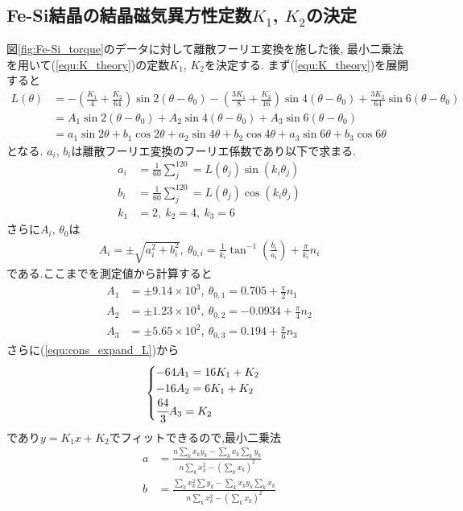 \subsection{Fe-Si結晶の結晶磁気異方性定数$K_1$, $K_2$の決定}
図\ref{fig:Fe-Si_torque}のデータに対して離散フーリエ変換を施した後,
最小二乗法を用いて(\ref{equ:K_theory})の定数$K_1$, $K_2$を決定する.
まず(\ref{equ:K_theory})を展開すると
\begin{align}
  \label{equ:cons_expand_L}
  L(\theta)&=-(\frac{K_1}{4}+\frac{K_2}{64})\sin2(\theta-\theta_0)-(\frac{3K_1}{8}+\frac{K_2}{16})\sin4(\theta-\theta_0)+\frac{3K_2}{64}\sin6(\theta-\theta_0)\nonumber\\
  &=A_1\sin2(\theta-\theta_0)+A_2\sin4(\theta-\theta_0)+A_3\sin6(\theta-\theta_0)\nonumber\\
  &=a_1\sin2\theta+b_1\cos2\theta+a_2\sin4\theta+b_2\cos4\theta+a_3\sin6\theta+b_3\cos6\theta
\end{align}
となる. $a_i$, $b_i$は離散フーリエ変換のフーリエ係数であり以下で求まる.
\begin{align}
  a_i&=\frac{1}{60}\sum^{120}_j=L(\theta_j)\sin(k_i\theta_j)\\
  b_i&=\frac{1}{60}\sum^{120}_j=L(\theta_j)\cos(k_i\theta_j)\\
  k_1&=2,\ k_2=4,\ k_3=6
\end{align}
さらに$A_i$, $\theta_0$は
\begin{align}
  A_i=\pm\sqrt{a_i^2+b_i^2},\ \theta_{0,i}=\frac{1}{k_i}\tan^{-1}\left(\frac{b_i}{a_i}\right)+\frac{\pi}{k_i}n_i
\end{align}
である.ここまでを測定値から計算すると
\begin{align}
  A_1&=\pm9.14\times10^3,\ \theta_{0,1}=0.705+\frac{\pi}{2}n_1\\
  A_2&=\pm1.23\times10^4,\ \theta_{0,2}=-0.0934+\frac{\pi}{4}n_2\\
  A_3&=\pm5.65\times10^2,\ \theta_{0,3}=0.194+\frac{\pi}{6}n_3
\end{align}
さらに(\ref{equ:cons_expand_L})から
\begin{align}
  \begin{cases}
    -64A_1=16K_1+K_2\\
    -16A_2=6K_1+K_2\\
    \cfrac{64}{3}A_3=K_2
  \end{cases}
\end{align}
であり$y=K_1x+K_2$でフィットできるので,最小二乗法
\begin{align}
  \label{equ:saisyojijoho}
  a&=\frac{n\sum_k x_ky_k-\sum_k x_k\sum_k y_k}{n\sum_k x_k^2-\left(\sum_k x_k\right)^2}\\
  b&=\frac{\sum_k x_k^2\sum y_k-\sum_k x_ky_k\sum_k x_k}{n\sum_k x_k^2-\left(\sum_k x_k\right)^2}
\end{align}
